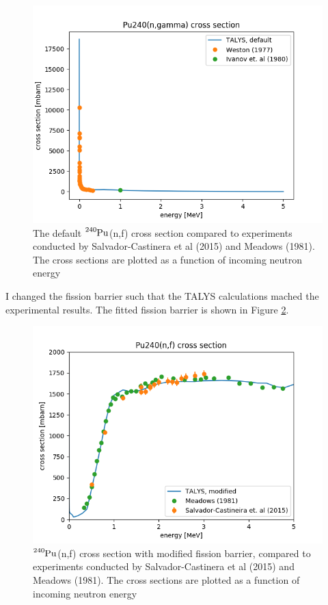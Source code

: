\documentclass[]{article}
\begin{document}
  \begin{figure} [H]
	\centering
	\includegraphics[scale=0.7]{Default_TALYS_gamma_xs_vs_exp.png}
	\caption{The default $\ce{^{240}Pu}$(n,f) cross section compared to experiments conducted by Salvador-Castinera et al (2015) and Meadows (1981). The cross sections are plotted as a function of incoming neutron energy }
	\label{fig:Default_TALYS_gamma_xs_vs_exp}
\end{figure}

I changed the fission barrier such that the TALYS calculations mached the experimental results. The fitted fission barrier is shown in Figure \ref{fig:Modified_TALYS_gamma_xs_vs_exp}.

  \begin{figure} [H]
	\centering
	\includegraphics[scale=0.7]{Modified_TALYS_fission_xs_vs_exp.png}
	\caption{ $\ce{^{240}Pu}$(n,f) cross section with modified fission barrier, compared to experiments conducted by Salvador-Castinera et al (2015) and Meadows (1981). The cross sections are plotted as a function of incoming neutron energy}
	\label{fig:Modified_TALYS_gamma_xs_vs_exp}
\end{figure}
\end{document}
